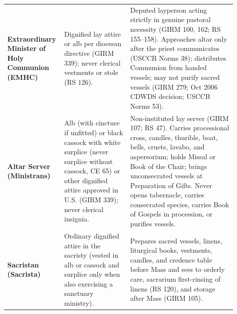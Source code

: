 {\begin{longtable}{>{\raggedright\arraybackslash}p{0.20\linewidth}>{\raggedright\arraybackslash}p{0.28\linewidth}>{\raggedright\arraybackslash}p{0.45\linewidth}}
\textbf{Extraordinary Minister of Holy Communion (EMHC)} & Dignified lay attire or alb per diocesan directive (GIRM 339); never clerical vestments or stole (RS 126). & Deputed layperson acting strictly in genuine pastoral necessity (GIRM 100, 162; RS 155--158). Approaches altar only after the priest communicates (USCCB Norms 38); distributes Communion from handed vessels; may not purify sacred vessels (GIRM 279; Oct 2006 CDWDS decision; USCCB Norms 53). \\
\textbf{Altar Server (Ministrans)} & Alb (with cincture if unfitted) or black cassock with white surplice (never surplice without cassock, CE 65) or other dignified attire approved in U.S. (GIRM 339); never clerical insignia. & Non-instituted lay server (GIRM 107; RS 47). Carries processional cross, candles, thurible, boat, bells, cruets, lavabo, and aspersorium; holds Missal or Book of the Chair; brings unconsecrated vessels at Preparation of Gifts. Never opens tabernacle, carries consecrated species, carries Book of Gospels in procession, or purifies vessels. \\
\textbf{Sacristan (Sacrista)} & Ordinary dignified attire in the sacristy (vested in alb or cassock and surplice only when also exercising a sanctuary ministry). & Prepares sacred vessels, linens, liturgical books, vestments, candles, and credence table before Mass and sees to orderly care, sacrarium first-rinsing of linens (RS 120), and storage after Mass (GIRM 105). \\
\bottomrule
\end{longtable}}

\clearpage
